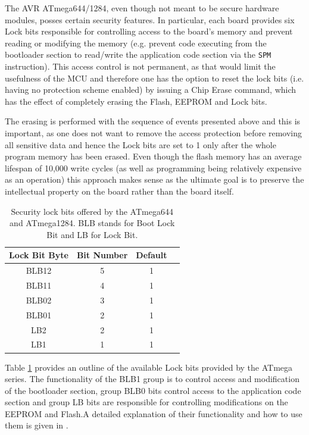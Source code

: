 	The AVR ATmega644/1284, even though not meant to be secure hardware modules, posses certain security features. In particular, each board provides six Lock bits responsible for controlling access to the board's memory and prevent reading or modifying the memory (e.g. prevent code executing from the bootloader section to read/write the application code section via the \texttt{SPM} instruction). This access control is not permanent, as that would limit the usefulness of the MCU and therefore one has the option to reset the lock bits (i.e. having no protection scheme enabled) by issuing a Chip Erase command, which has the effect of completely erasing the Flash, EEPROM and Lock bits.
	
	The erasing is performed with the sequence of events presented above and this is important, as one does not want to remove the access protection before removing all sensitive data and hence the Lock bits are set to 1 only after the whole program memory has been erased. Even though the flash memory has an average lifespan of 10,000 write cycles (as well as programming being relatively expensive as an operation) this approach makes sense as the ultimate goal is to preserve the intellectual property on the board rather than the board itself.
	
	\begin{table}
		\caption{{\footnotesize Security lock bits offered by the ATmega644 and ATmega1284. BLB stands for Boot Lock Bit and LB for Lock Bit.}}
		\label{table:lock_bits}
		\center
		\begin{tabular}{| c | c | c | c |}
			\hline
			\textbf{Lock Bit Byte} & \textbf{Bit Number} & \textbf{Default}\\
			\hline \hline
			BLB12 & 5 & 1\\
			BLB11 & 4 & 1\\
			BLB02 & 3 & 1\\
			BLB01 & 2 & 1\\
			LB2 & 2 & 1 \\
			LB1 & 1 & 1 \\
			\hline
		\end{tabular}
		
	\end{table}
	
Table \ref{table:lock_bits}	 provides an outline of the available Lock bits provided by the ATmega series. The functionality of the BLB1 group is to control access and modification of the bootloader section, group BLB0 bits control access to the application code section and group LB bits are responsible for controlling modifications on the EEPROM and Flash.A detailed explanation of their functionality and how to use them is given in \citep{atmega_manual}.
	
